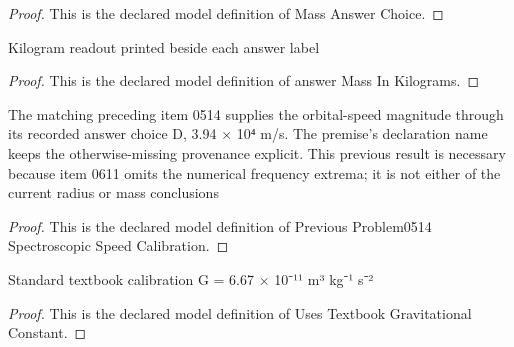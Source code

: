\begin{proof}
  This is the declared model definition of Mass Answer Choice.
\end{proof}
\begin{definition}
  \label{def:physics:phyx-mini-0611:phyxminiproblems-problemphyxmini0611-answermassinkilograms}
  Kilogram readout printed beside each answer label
\end{definition}
\begin{proof}
  This is the declared model definition of answer Mass In Kilograms.
\end{proof}
\begin{definition}
  \label{def:physics:phyx-mini-0611:phyxminiproblems-problemphyxmini0611-previousproblem0514spectroscopicspeedcalibration}
  The matching preceding item 0514 supplies the orbital-speed magnitude through its recorded answer choice D, 3.94 × 10⁴ m/s. The premise's declaration name keeps the otherwise-missing provenance explicit. This previous result is necessary because item 0611 omits the numerical frequency extrema; it is not either of the current radius or mass conclusions
\end{definition}
\begin{proof}
  This is the declared model definition of Previous Problem0514 Spectroscopic Speed Calibration.
\end{proof}
\begin{definition}
  \label{def:physics:phyx-mini-0611:phyxminiproblems-problemphyxmini0611-usestextbookgravitationalconstant}
  Standard textbook calibration G = 6.67 × 10⁻¹¹ m³ kg⁻¹ s⁻²
\end{definition}
\begin{proof}
  This is the declared model definition of Uses Textbook Gravitational Constant.
\end{proof}
